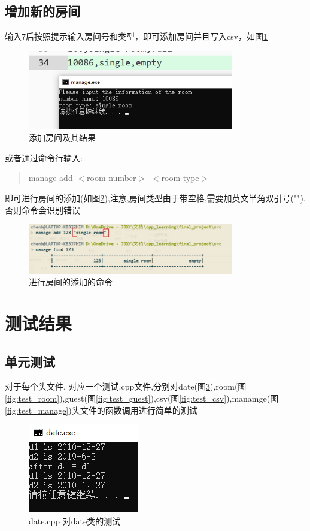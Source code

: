 \documentclass[UTF8]{ctexart}
\begin{document}
  \subsection{增加新的房间}
    输入7后按照提示输入房间号和类型，即可添加房间并且写入csv，如图\ref{fig:7}
    \begin{figure}[H]
      \centering
      \includegraphics[width=0.8\textwidth]{7}
      \caption{添加房间及其结果}
      \label{fig:7}
    \end{figure}
    或者通过命令行输入:
    \begin{quote}
      manage add $<$room number$>$ $<$room type$>$
    \end{quote}
    即可进行房间的添加(如图\ref{fig:c_7}),注意,房间类型由于带空格,需要加英文半角双引号(""),否则命令会识别错误
    \begin{figure}[H]
      \centering
      \includegraphics[width=0.8\textwidth]{c_7}
      \caption{进行房间的添加的命令}
      \label{fig:c_7}
    \end{figure}
\section{测试结果}
  \subsection{单元测试}
    对于每个头文件, 对应一个测试.cpp文件,分别对date(图\ref{fig:test_date}),room(图\ref{fig:test_room}),guest(图\ref{fig:test_guest}),csv(图\ref{fig:test_csv}),manamge(图\ref{fig:test_manage})头文件的函数调用进行简单的测试
    \begin{figure}[H]
      \centering
      \includegraphics[scale=1]{test_date}
      \caption{date.cpp 对date类的测试}
      \label{fig:test_date}
    \end{figure}
\end{document}
